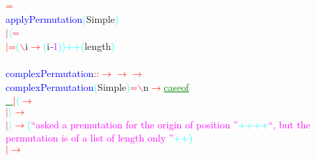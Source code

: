 \hsspace \hsspace \hsspace \hsspace \textcolor{red}{=}\\\textcolor{blue}{applyPermutation}\hsspace \textcolor{cyan}{(}{\rm{}Simple}\textcolor{cyan}{)}\\\hstab \textcolor{red}{\ensuremath{|}}\hsspace \textcolor{cyan}{\ensuremath{\langle}}\hsspace \textcolor{red}{=}\\\hstab \textcolor{red}{\ensuremath{|}}\hsspace \textcolor{red}{=}\hsspace \textcolor{cyan}{(}\textcolor{red}{$\backslash$}{\rm{}i}\hsspace \textcolor{red}{\ensuremath{\rightarrow}}\hsspace \textcolor{cyan}{(}{\rm{}i}\textcolor{blue}{{\it{}-}}\textcolor{magenta}{1}\textcolor{cyan}{)}\textcolor{cyan}{)}\hsspace \textcolor{cyan}{++}\hsspace \textcolor{cyan}{(}{\rm{}length}\textcolor{cyan}{)}\\\\\textcolor{blue}{complexPermutation}\hsspace \textcolor{red}{::}\hsspace \textcolor{red}{\ensuremath{\rightarrow}}\hsspace \textcolor{red}{\ensuremath{\rightarrow}}\hsspace \textcolor{red}{\ensuremath{\rightarrow}}\\\textcolor{blue}{complexPermutation}\hsspace \textcolor{cyan}{(}{\rm{}Simple}\textcolor{cyan}{)}\hsspace \textcolor{red}{=}\hsspace \textcolor{red}{$\backslash$}{\rm{}n}\hsspace \textcolor{red}{\ensuremath{\rightarrow}}\hsspace \textcolor{green}{\underline{case}}\hsspace {\rm{}()}\hsspace \textcolor{green}{\underline{of}}\\\hstab \textcolor{green}{\underline{\_}}\hsspace \textcolor{red}{\ensuremath{|}}\hsspace \textcolor{cyan}{\ensuremath{\langle}}\hsspace \hsspace \hsspace \textcolor{red}{\ensuremath{\rightarrow}}\\\hstab \hsspace \hsspace \textcolor{red}{\ensuremath{|}}\hsspace \textcolor{cyan}{\ensuremath{\rangle}}\hsspace \hsspace \hsspace \textcolor{red}{\ensuremath{\rightarrow}}\\\hstab \hsspace \hsspace \textcolor{red}{\ensuremath{|}}\hsspace \textcolor{cyan}{\ensuremath{\rangle}}\hsspace \hsspace \hsspace \hsspace \hsspace \textcolor{red}{\ensuremath{\rightarrow}}\hsspace \textcolor{cyan}{(}\textcolor{magenta}{``asked a premutation for the origin of position ''}\hsspace \textcolor{cyan}{++}\hsspace \textcolor{cyan}{++}\hsspace \textcolor{magenta}{``, but the permutation is of a list of length only ''}\hsspace \textcolor{cyan}{++}\textcolor{cyan}{)}\\\hstab \hsspace \hsspace \textcolor{red}{\ensuremath{|}}\hsspace \textcolor{red}{\ensuremath{\rightarrow}}\hsspace 
